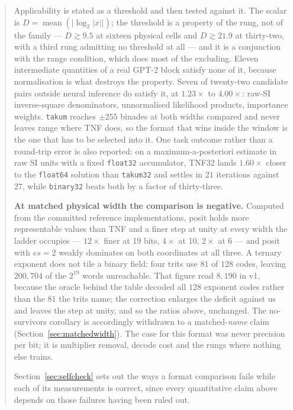 \documentclass[11pt]{article}
\theoremstyle{definition}
\begin{document}
\begin{abstract}
Applicability is stated as a threshold and then tested against it. The scalar is
$D=\operatorname{mean}(\lvert\log_2|x|\rvert)$; the threshold is a property of the
rung, not of the family --- $D \gtrsim 9.5$ at sixteen physical cells and
$D \gtrsim 21.9$ at thirty-two, with a third rung admitting no threshold at all ---
and it is a conjunction with the range condition, which does most of the excluding.
Eleven intermediate quantities of a real GPT-2 block satisfy none of it, because
normalisation is what destroys the property. Seven of twenty-two candidate pairs
outside neural inference do satisfy it, at $1.23\times$ to $4.00\times$: raw-SI
inverse-square denominators, unnormalised likelihood products, importance weights.
\texttt{takum} reaches $\pm 255$ binades at both widths compared and never leaves
range where TNF does, so the format that wins inside the window is the one that has
to be selected into it. One task outcome rather than a round-trip error is also
reported: on a maximum-a-posteriori estimate in raw SI units with a fixed
\texttt{float32} accumulator, TNF32 lands $1.60\times$ closer to the
\texttt{float64} solution than \texttt{takum32} and settles in $21$ iterations
against $27$, while \texttt{binary32} beats both by a factor of thirty-three.

\textbf{At matched physical width the comparison is negative.} Computed from
the committed reference implementations, posit holds more representable values
than TNF and a finer step at unity at every width the ladder occupies --- $12\times$
finer at 19 bits, $4\times$ at 10, $2\times$ at 6 --- and posit with $es{=}2$ weakly
dominates on both coordinates at all three. A ternary exponent does not tile a
binary field: four trits use $81$ of $128$ codes, leaving $200{,}704$ of the
$2^{19}$ words unreachable. That figure read $8{,}190$ in v1, because the oracle
behind the table decoded all $128$ exponent codes rather than the $81$ the trits
name; the correction enlarges the deficit against us and leaves the step at
unity, and so the ratios above, unchanged. The no-survivors corollary is
accordingly withdrawn to a
matched-\emph{name} claim (Section~\ref{sec:matchedwidth}). The case for this
format was never precision per bit; it is multiplier removal, decode cost and the
rungs where nothing else trains.

Section~\ref{sec:selfcheck} sets out the ways a format comparison fails while
each of its measurements is correct, since every quantitative claim above depends
on those failures having been ruled out.


\end{abstract}
\end{document}
